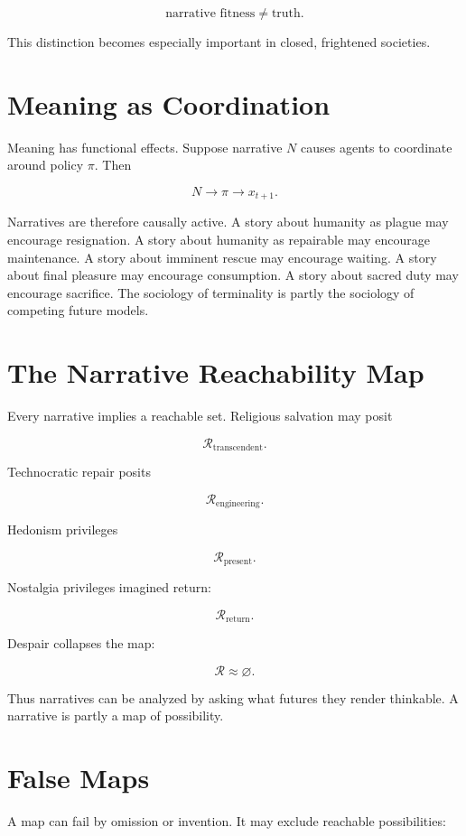 \documentclass[11pt,oneside]{book}
\theoremstyle{definition}
\theoremstyle{remark}
\newcommand{\R}{\mathcal{R}}
\begin{document}
\[
\text{narrative fitness} \neq \text{truth}.
\]

This distinction becomes especially important in closed, frightened societies.

\section{Meaning as Coordination}

Meaning has functional effects. Suppose narrative \(N\) causes agents to coordinate around policy
\(\pi\). Then

\[
N\rightarrow\pi\rightarrow x_{t+1}.
\]

Narratives are therefore causally active. A story about humanity as plague may encourage
resignation. A story about humanity as repairable may encourage maintenance. A story about imminent
rescue may encourage waiting. A story about final pleasure may encourage consumption. A story about
sacred duty may encourage sacrifice. The sociology of terminality is partly the sociology of
competing future models.

\section{The Narrative Reachability Map}

Every narrative implies a reachable set. Religious salvation may posit

\[
\R_{\mathrm{transcendent}}.
\]

Technocratic repair posits

\[
\R_{\mathrm{engineering}}.
\]

Hedonism privileges

\[
\R_{\mathrm{present}}.
\]

Nostalgia privileges imagined return:

\[
\R_{\mathrm{return}}.
\]

Despair collapses the map:

\[
\R\approx\varnothing.
\]

Thus narratives can be analyzed by asking what futures they render thinkable. A narrative is partly
a map of possibility.

\section{False Maps}

A map can fail by omission or invention. It may exclude reachable possibilities:
\end{document}
